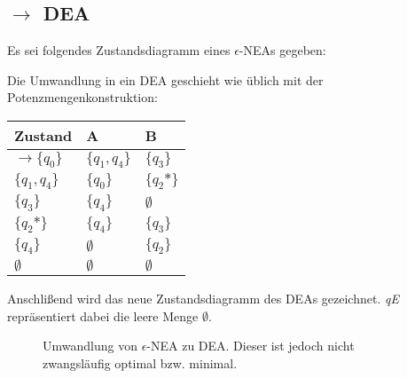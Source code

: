 \subsection[Epsilon-NEA zu DEA]{\enea $\to$ DEA}
Es sei folgendes Zustandsdiagramm eines $\epsilon$-NEAs gegeben:\par
\begin{figure}[H]
    \centering
    \begin{transitiongraph}[fa]
    \end{transitiongraph}
    \label{graph:epsNEA}
\end{figure}
Die Umwandlung in ein DEA geschieht wie üblich mit der Potenzmengenkonstruktion:
\begin{table}[H]
\centering
\begin{tabular}{|l|l|l|}
\hline
Zustand         & A           & B               \\ \hline
$\to \{q_0\}$       & $\{q_1,q_4\}$ & $\{q_3\}$           \\ \hline
$\{q_1,q_4\}$     & $\{q_0\}$     & $\{q_2\mbox{*}\}$ \\ \hline
$\{q_3\}$         & $\{q_4\}$     & $\emptyset$     \\ \hline
$\{q_2\mbox{*}\}$ & $\{q_4\}$     & $\{q_3\}$         \\ \hline
$\{q_4\}$         & $\emptyset$ & $\{q_2\}$           \\ \hline
$\emptyset$     & $\emptyset$ & $\emptyset$     \\ \hline
\end{tabular}
\end{table}
Anschlißend wird das neue Zustandsdiagramm des DEAs gezeichnet. \textit{qE} repräsentiert dabei die leere Menge $\emptyset$.\par
\begin{figure}[H]
    \centering
    \begin{transitiongraph}[fa]
    \end{transitiongraph}
    \caption{Umwandlung von $\epsilon$-NEA zu DEA. Dieser ist jedoch nicht zwangsläufig optimal bzw. minimal.}
\end{figure}
\newpage
